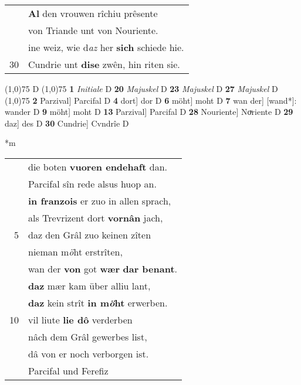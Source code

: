 \documentclass[8pt,a4paper,notitlepage]{article}
\begin{document}
\begin{table}[ht]
\begin{minipage}[t]{0.5\linewidth}
\begin{tabular}{rl}
 & \textbf{Al} den vrouwen rîchiu prêsente\\ 
 & von Triande unt von Nouriente.\\ 
 & ine weiz, wie d\textit{az} her \textbf{sich} schiede hie.\\ 
30 & Cundrie unt \textbf{dise} zwên, hin riten sie.\\ 
\end{tabular}
\scriptsize
\line(1,0){75} \newline
D \newline
\line(1,0){75} \newline
\textbf{1} \textit{Initiale} D  \textbf{20} \textit{Majuskel} D  \textbf{23} \textit{Majuskel} D  \textbf{27} \textit{Majuskel} D  \newline
\line(1,0){75} \newline
\textbf{2} Parzival] Parcifal D \textbf{4} dort] dor D \textbf{6} möht] moht D \textbf{7} wan der] [wand*]: wander D \textbf{9} möht] moht D \textbf{13} Parzival] Parcifal D \textbf{28} Nouriente] Noͮriente D \textbf{29} daz] des D \textbf{30} Cundrie] Cvndrîe D \newline
\end{minipage}
\hspace{0.5cm}
\begin{minipage}[t]{0.5\linewidth}
\small
\begin{center}*m
\end{center}
\begin{tabular}{rl}
 & die boten \textbf{vuoren endehaft} dan.\\ 
 & Parcifal sîn rede alsus huop an.\\ 
 & \textbf{in franzois} er zuo in allen sprach,\\ 
 & als Trevrizent dort \textbf{vornân} jach,\\ 
5 & daz den Grâl zuo keinen zîten\\ 
 & nieman m\textit{ö}ht erstrîten,\\ 
 & wan der \textbf{von} got \textbf{wær} \textbf{dar benant}.\\ 
 & \textbf{daz} mær kam über alliu lant,\\ 
 & \textbf{daz} kein strît \textbf{in m\textit{ö}ht} erwerben.\\ 
10 & vil liute \textbf{lie dô} verderben\\ 
 & nâch dem Grâl gewerbes list,\\ 
 & dâ von er noch verborgen ist.\\ 
 & Parcifal und Ferefiz\\ 

\end{tabular}
\end{minipage}
\end{table}
\end{document}
